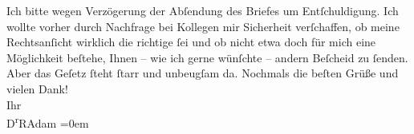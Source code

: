 \begin{ledgroupsized}[t]{13cm}
           \pstart
           Ich bitte wegen Verzögerung der Abſendung des Briefes um Entſchuldigung. Ich wollte
               vorher durch Nachfrage bei Kollegen mir Sicherheit verſchaffen, ob meine
               Rechtsanſicht wirklich die richtige ſei und ob nicht etwa doch für mich eine
               Möglichkeit beſtehe, Ihnen – wie ich gerne wünſchte – andern Beſcheid zu ſenden. Aber
                  {\pb}das Geſetz ſteht ſtarr und unbeugſam
               da.\pend
           \pstart
           Nochmals die beſten Grüße und vielen Dank!{\\[\baselineskip]}Ihr{\\[\baselineskip]}\spacefill\mbox{D\textsuperscript{r}RAdam}\pend
           \leftskip=0em{}
         
         \endnumbering{}\end{ledgroupsized}  \newcommand{\dateiname}{L02357}\newcommand{\titel}{Robert Adam an Arthur Schnitzler, 1. – 3. 11. 1920}\newcommand{\editorInnen}{Martin Anton Müller und Gerd-Hermann Susen}
      